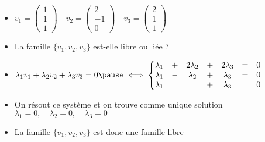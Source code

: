 \begin{frame}
\begin{exemple}
\begin{itemize}
\item
$v_1=\left(\begin{smallmatrix}  1\\1\\1 \end{smallmatrix}\right)\quad
v_2 = \left(\begin{smallmatrix} 2\\-1\\0 \end{smallmatrix}\right)\quad
v_3 = \left(\begin{smallmatrix} 2\\1\\1  \end{smallmatrix}\right)$
\pause
\item
La famille $\{v_1, v_2, v_3\}$ est-elle libre ou liée ?
\pause
\item $\lambda_1 v_1+ \lambda_2 v_2 + \lambda_3 v_3 = 0
\pause
\iff \left \{ \begin{matrix}
\lambda_1&+&2\lambda_2&+& 2\lambda_{3}&=&0 \cr
\lambda_1&-&\lambda_2&+&\lambda_{3}&=&0\cr
\lambda_1&&&+&\lambda_{3}&=&0\cr
\end{matrix}\right.$
\pause
\item
On résout ce système et on trouve comme unique solution
$\lambda_1=0, \quad\lambda_2=0,\quad\lambda_{3}=0$
\pause
\item
La famille $\{v_1, v_2, v_3\}$ est donc une famille libre
\end{itemize}
\end{exemple}
\end{frame}


% 
% 




